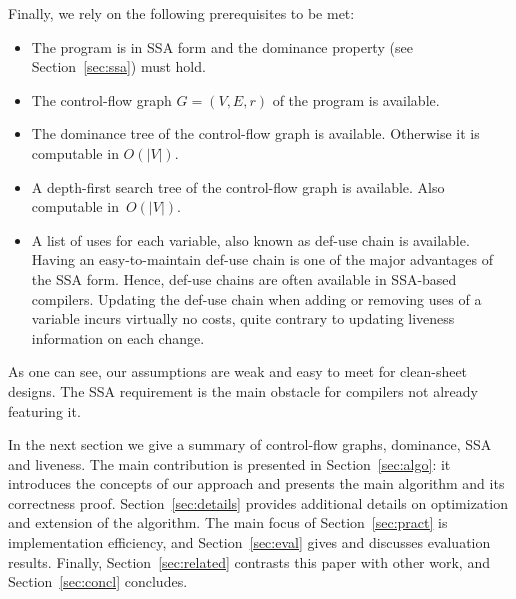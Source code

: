 Finally, we rely on the following prerequisites to be met:
\begin{itemize}
	\item The program is in SSA form and the dominance property (see Section~\ref{sec:ssa}) must hold.
	\item The control-flow graph $G=(V,E,r)$ of the program is available.
	\item The dominance tree of the control-flow graph is available. Otherwise it is computable in $O(|V|)$.
	\item A depth-first search tree of the control-flow graph is available. Also computable in~$O(|V|)$.
	\item A list of uses for each variable, also known as def-use chain is available.
		Having an easy-to-maintain def-use chain is one of the major advantages of the SSA form.
		Hence, def-use chains are often available in SSA-based compilers.
		Updating the def-use chain when adding or removing uses of a variable incurs virtually no costs, quite contrary to updating liveness information on each change.
\end{itemize}
As one can see, our assumptions are weak and easy to meet for clean-sheet designs.
The SSA requirement is the main obstacle for compilers not already featuring it.

In the next section we give a summary of control-flow graphs, dominance, SSA and liveness.
The main contribution is presented in Section~\ref{sec:algo}: it introduces the concepts of our approach and presents the main algorithm and its correctness proof.
Section~\ref{sec:details} provides additional details on optimization and extension of the algorithm.
The main focus of Section~\ref{sec:pract} is implementation efficiency, and Section~\ref{sec:eval} gives and discusses evaluation results.
Finally, Section~\ref{sec:related} contrasts this paper with other work, and Section~\ref{sec:concl} concludes.
